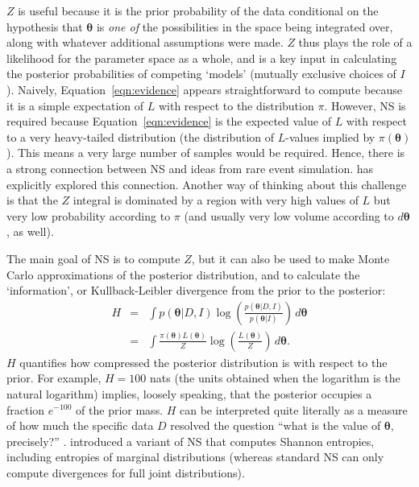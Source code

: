 \documentclass[entropy,article,submit,moreauthors,pdftex,10pt,a4paper]{Definitions/mdpi}
\newcommand{\xx}{\boldsymbol{\theta}}
\newcommand{\data}{D}
\newcommand{\II}{I}
\begin{document}
$Z$ is useful because it is the prior probability of the data conditional on
the hypothesis that $\xx$ is {\em one of}
the possibilities in the space being integrated over, along with
whatever additional assumptions were made. $Z$ thus plays the role
of a likelihood for the parameter space as a whole, and is a key input in
calculating the posterior probabilities of competing `models' (mutually
exclusive choices of $\II$).
Naively, Equation~\ref{eqn:evidence} appears straightforward to compute because
it is a simple expectation of $L$ with respect to the distribution $\pi$.
However,
NS is required because Equation~\ref{eqn:evidence}
is the expected value of $L$ with respect to a very heavy-tailed distribution
(the distribution of $L$-values implied by $\pi(\xx)$). This means a very
large number of samples would be required.
Hence, there is a strong
connection between NS and ideas from rare event simulation.
\citet{walter2017point} has explicitly explored this connection.
Another way of thinking about this
challenge is that the $Z$ integral is dominated by a region with very
high values of $L$ but very low probability according to $\pi$ (and usually
very low volume according to $d\xx$, as well).

The main goal of NS is to compute $Z$, but it can also be used to make
Monte Carlo approximations of the posterior distribution, and to
calculate the `information',
or Kullback-Leibler divergence from the prior to the posterior:
\begin{eqnarray}
H &=& \int p(\xx | \data, \II) \log
\left(\frac{p(\xx | \data, \II)}{p(\xx | \II)}\right) \, d\xx \\
&=& \int \frac{\pi(\xx) L(\xx)}{Z} \log
\left(\frac{L(\xx)}{Z}\right) \, d\xx.
\end{eqnarray}
$H$ quantifies how compressed the posterior distribution is with
respect to the prior. For example, $H = 100$ nats (the units obtained when
the logarithm is the natural logarithm) implies, loosely speaking,
that the posterior occupies a fraction $e^{-100}$ of the prior mass.
$H$ can be interpreted quite literally as a measure of how much
the specific data $\data$ resolved the question ``what is the value
of $\xx$, precisely?'' \citep{knuth_questions, van2017inquiry}.
\citet{brewer2017computing} introduced a variant of NS that computes
Shannon entropies, including entropies of marginal distributions (whereas
standard NS can only compute divergences for full joint distributions).
\end{document}
